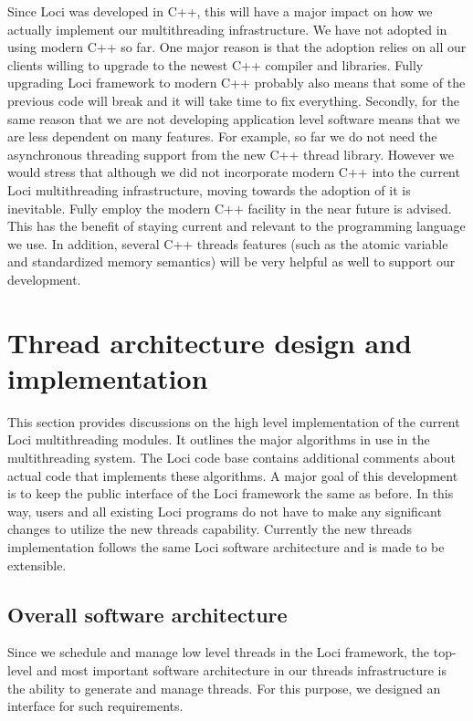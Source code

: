 \documentclass{article}
\begin{document}
Since Loci was developed in C++, this will have a major impact on how we
actually implement our multithreading infrastructure.  We have not
adopted in using modern C++ so far.  One major reason is that the
adoption relies on all our clients willing to upgrade to the newest C++
compiler and libraries.  Fully upgrading Loci framework to modern C++
probably also means that some of the previous code will break and it
will take time to fix everything.  Secondly, for the same reason that we
are not developing application level software means that we are less
dependent on many features.  For example, so far we do not need the
asynchronous threading support from the new C++ thread library.  However
we would stress that although we did not incorporate modern C++ into
the current Loci multithreading infrastructure, moving towards the
adoption of it is inevitable.  Fully employ the modern C++ facility in
the near future is advised.  This has the benefit of staying current and
relevant to the programming language we use.  In addition, several C++
threads features (such as the atomic variable and standardized memory
semantics) will be very helpful as well to support our development.

\section{Thread architecture design and implementation}
\label{sec:design}
This section provides discussions on the high level implementation of
the current Loci multithreading modules.  It outlines the major
algorithms in use in the multithreading system.  The Loci code base
contains additional comments about actual code that implements these
algorithms.  A major goal of this development is to keep the public
interface of the Loci framework the same as before. In this way, users
and all existing Loci programs do not have to make any significant
changes to utilize the new threads capability.  Currently the new
threads implementation follows the same Loci software architecture and
is made to be extensible.  


\subsection{Overall software architecture}
\label{sec:tm}
Since we schedule and manage low level threads in the Loci framework,
the top-level and most important software architecture in our threads
infrastructure is the ability to generate and manage threads.  For this
purpose, we designed an interface for such requirements.
\end{document}
